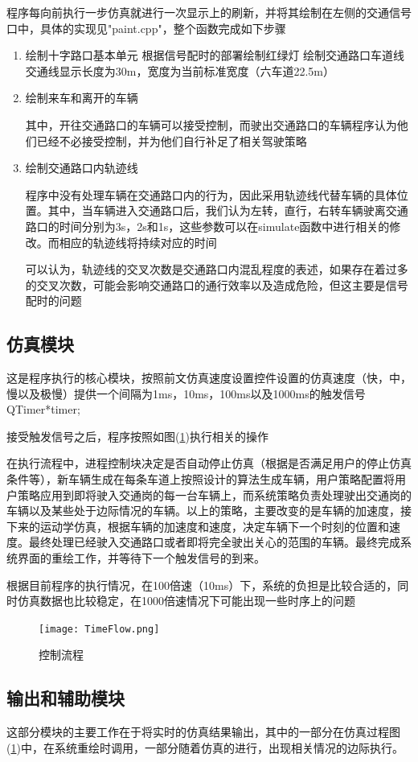 \documentclass[UTF8,a4paper]{ctexart}
\begin{document}
程序每向前执行一步仿真就进行一次显示上的刷新，并将其绘制在左侧的交通信号口中，具体的实现见"paint.cpp"，整个函数完成如下步骤
\begin{enumerate}
\item 绘制十字路口基本单元
\subitem 根据信号配时的部署绘制红绿灯
\subitem 绘制交通路口车道线
交通线显示长度为30m，宽度为当前标准宽度（六车道22.5m）
\item 绘制来车和离开的车辆

其中，开往交通路口的车辆可以接受控制，而驶出交通路口的车辆程序认为他们已经不必接受控制，并为他们自行补足了相关驾驶策略
\item 绘制交通路口内轨迹线

程序中没有处理车辆在交通路口内的行为，因此采用轨迹线代替车辆的具体位置。其中，当车辆进入交通路口后，我们认为左转，直行，右转车辆驶离交通路口的时间分别为3s，2s和1s，这些参数可以在simulate函数中进行相关的修改。而相应的轨迹线将持续对应的时间

可以认为，轨迹线的交叉次数是交通路口内混乱程度的表述，如果存在着过多的交叉次数，可能会影响交通路口的通行效率以及造成危险，但这主要是信号配时的问题
\end{enumerate}
\subsection{仿真模块}
这是程序执行的核心模块，按照前文仿真速度设置控件设置的仿真速度（快，中，慢以及极慢）提供一个间隔为1ms，10ms，100ms以及1000ms的触发信号QTimer*timer;

接受触发信号之后，程序按照如图(\ref{timeflow})执行相关的操作

在执行流程中，进程控制块决定是否自动停止仿真（根据是否满足用户的停止仿真条件等），新车辆生成在每条车道上按照设计的算法生成车辆，用户策略配置将用户策略应用到即将驶入交通岗的每一台车辆上，而系统策略负责处理驶出交通岗的车辆以及某些处于边际情况的车辆。以上的策略，主要改变的是车辆的加速度，接下来的运动学仿真，根据车辆的加速度和速度，决定车辆下一个时刻的位置和速度。最终处理已经驶入交通路口或者即将完全驶出关心的范围的车辆。最终完成系统界面的重绘工作，并等待下一个触发信号的到来。

根据目前程序的执行情况，在100倍速（10ms）下，系统的负担是比较合适的，同时仿真数据也比较稳定，在1000倍速情况下可能出现一些时序上的问题
\begin{figure}
\centering
\texttt{[image: TimeFlow.png]}
\caption{控制流程}
\label{timeflow}
\end{figure}
\subsection{输出和辅助模块}
这部分模块的主要工作在于将实时的仿真结果输出，其中的一部分在仿真过程图(\ref{timeflow})中，在系统重绘时调用，一部分随着仿真的进行，出现相关情况的边际执行。
\end{document}
